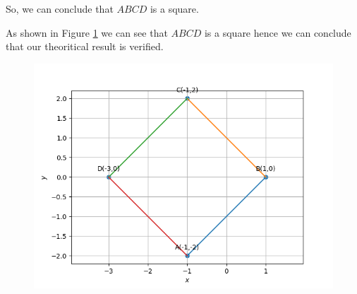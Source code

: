 \documentclass[12pt]{article}
\begin{document}
\begin{enumerate}
	So, we can conclude that $ABCD$ is a square.

	As shown in Figure \ref{fig:10/7/1/6/Fig1} we can see that $ABCD$ is a square hence we can conclude that our theoritical result is verified.
 
\begin{figure}[!h]
	\begin{center} 
	    \includegraphics[width=\columnwidth]{chapters/10/7/1/6/figs/quad1}
	\end{center}
\caption{}
\label{fig:10/7/1/6/Fig1}
\end{figure}


\end{enumerate}
\end{document}
